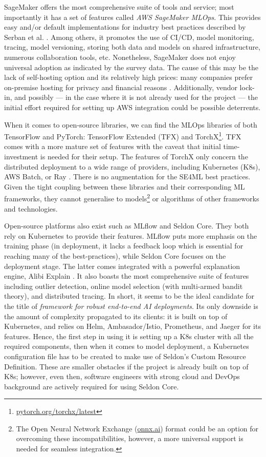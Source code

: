 SageMaker offers the most comprehensive suite of tools and service; most importantly it has a set of features called \textit{AWS SageMaker MLOps}. This provides easy and/or default implementations for industry best practices described by Serban et al. \cite{serban2020adoption,serban2021practices}. Among others, it promotes the use of CI/CD, model monitoring, tracing, model versioning, storing both data and models on shared infrastructure, numerous collaboration tools, etc. Nonetheless, SageMaker does not enjoy universal adoption as indicated by the survey data. The cause of this may be the lack of self-hosting option and its relatively high prices: many companies prefer on-premise hosting for privacy and financial reasons \cite{bosch2021engineering}. Additionally, vendor lock-in, and possibly --- in the case where it is not already used for the project --- the initial effort required for setting up AWS integration could be possible deterrents.

When it comes to open-source libraries, we can find the MLOps libraries of both TensorFlow and PyTorch: TensorFlow Extended (TFX) \cite{baylor2017tfx} and TorchX\footnote{\href{https://pytorch.org/torchx/latest/}{pytorch.org/torchx/latest}}. TFX comes with a more mature set of features with the caveat that initial time-investment is needed for their setup. The features of TorchX only concern the distributed deployment to a wide range of providers, including Kubernetes (K8s), AWS Batch, or Ray \cite{moritz2018ray}. There is no augmentation for the SE4ML best practices. Given the tight coupling between these libraries and their corresponding ML frameworks, they cannot generalise to models\footnote{The Open Neural Network Exchange (\href{https://onnx.ai/}{onnx.ai}) format could be an option for overcoming these incompatibilities, however, a more universal support is needed for seamless integration.} or algorithms of other frameworks and technologies. 

Open-source platforms also exist such as MLflow and Seldon Core. They both rely on Kubernetes to provide their features. MLflow puts more emphasis on the training phase (in deployment, it lacks a feedback loop which is essential for reaching many of the best-practices), while Seldon Core focuses on the deployment stage. The latter comes integrated with a powerful explanation engine, Alibi Explain \cite{klaise2021alibi}. It also boasts the most comprehensive suite of features including outlier detection, online model selection (with multi-armed bandit theory), and distributed tracing. In short, it seems to be the ideal candidate for the title of \textit{framework for robust end-to-end AI deployments}. Its only downside is the amount of complexity propagated to its clients: it is built on top of Kubernetes, and relies on Helm, Ambasador/Istio, Prometheus, and Jaeger for its features. Hence, the first step in using it is setting up a K8s cluster with all the required components, then when it comes to model deployment, a Kubernetes configuration file has to be created to make use of Seldon's Custom Resource Definition. These are smaller obstacles if the project is already built on top of K8s; however, even then, software engineers with strong cloud and DevOps background are actively required for using Seldon Core.

